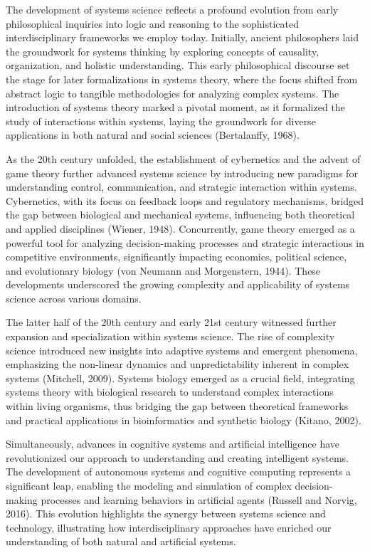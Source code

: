 \documentclass[twocolumn]{article}
\begin{document}
\textcolor{primary}{The development of systems science reflects a profound evolution from early philosophical inquiries into logic and reasoning to the sophisticated interdisciplinary frameworks we employ today. Initially, ancient philosophers laid the groundwork for systems thinking by exploring concepts of causality, organization, and holistic understanding. This early philosophical discourse set the stage for later formalizations in systems theory, where the focus shifted from abstract logic to tangible methodologies for analyzing complex systems. The introduction of systems theory marked a pivotal moment, as it formalized the study of interactions within systems, laying the groundwork for diverse applications in both natural and social sciences (Bertalanffy, 1968).}

\textcolor{secondary}{As the 20th century unfolded, the establishment of cybernetics and the advent of game theory further advanced systems science by introducing new paradigms for understanding control, communication, and strategic interaction within systems. Cybernetics, with its focus on feedback loops and regulatory mechanisms, bridged the gap between biological and mechanical systems, influencing both theoretical and applied disciplines (Wiener, 1948). Concurrently, game theory emerged as a powerful tool for analyzing decision-making processes and strategic interactions in competitive environments, significantly impacting economics, political science, and evolutionary biology (von Neumann and Morgenstern, 1944). These developments underscored the growing complexity and applicability of systems science across various domains.}

\textcolor{primary}{The latter half of the 20th century and early 21st century witnessed further expansion and specialization within systems science. The rise of complexity science introduced new insights into adaptive systems and emergent phenomena, emphasizing the non-linear dynamics and unpredictability inherent in complex systems (Mitchell, 2009). Systems biology emerged as a crucial field, integrating systems theory with biological research to understand complex interactions within living organisms, thus bridging the gap between theoretical frameworks and practical applications in bioinformatics and synthetic biology (Kitano, 2002).}

\textcolor{secondary}{Simultaneously, advances in cognitive systems and artificial intelligence have revolutionized our approach to understanding and creating intelligent systems. The development of autonomous systems and cognitive computing represents a significant leap, enabling the modeling and simulation of complex decision-making processes and learning behaviors in artificial agents (Russell and Norvig, 2016). This evolution highlights the synergy between systems science and technology, illustrating how interdisciplinary approaches have enriched our understanding of both natural and artificial systems.}
\end{document}
